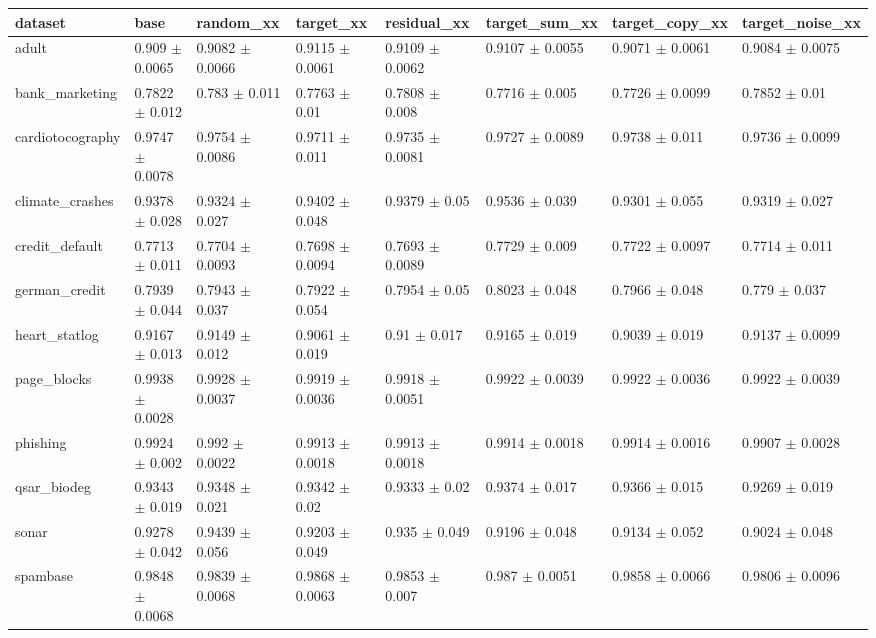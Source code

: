 \begin{tabular}{llllllll}
\toprule
dataset & base & random\_xx & target\_xx & residual\_xx & target\_sum\_xx & target\_copy\_xx & target\_noise\_xx \\
\midrule
adult & 0.909 $\pm$ 0.0065 & 0.9082 $\pm$ 0.0066 & 0.9115 $\pm$ 0.0061 & 0.9109 $\pm$ 0.0062 & 0.9107 $\pm$ 0.0055 & 0.9071 $\pm$ 0.0061 & 0.9084 $\pm$ 0.0075 \\
bank\_marketing & 0.7822 $\pm$ 0.012 & 0.783 $\pm$ 0.011 & 0.7763 $\pm$ 0.01 & 0.7808 $\pm$ 0.008 & 0.7716 $\pm$ 0.005 & 0.7726 $\pm$ 0.0099 & 0.7852 $\pm$ 0.01 \\
cardiotocography & 0.9747 $\pm$ 0.0078 & 0.9754 $\pm$ 0.0086 & 0.9711 $\pm$ 0.011 & 0.9735 $\pm$ 0.0081 & 0.9727 $\pm$ 0.0089 & 0.9738 $\pm$ 0.011 & 0.9736 $\pm$ 0.0099 \\
climate\_crashes & 0.9378 $\pm$ 0.028 & 0.9324 $\pm$ 0.027 & 0.9402 $\pm$ 0.048 & 0.9379 $\pm$ 0.05 & 0.9536 $\pm$ 0.039 & 0.9301 $\pm$ 0.055 & 0.9319 $\pm$ 0.027 \\
credit\_default & 0.7713 $\pm$ 0.011 & 0.7704 $\pm$ 0.0093 & 0.7698 $\pm$ 0.0094 & 0.7693 $\pm$ 0.0089 & 0.7729 $\pm$ 0.009 & 0.7722 $\pm$ 0.0097 & 0.7714 $\pm$ 0.011 \\
german\_credit & 0.7939 $\pm$ 0.044 & 0.7943 $\pm$ 0.037 & 0.7922 $\pm$ 0.054 & 0.7954 $\pm$ 0.05 & 0.8023 $\pm$ 0.048 & 0.7966 $\pm$ 0.048 & 0.779 $\pm$ 0.037 \\
heart\_statlog & 0.9167 $\pm$ 0.013 & 0.9149 $\pm$ 0.012 & 0.9061 $\pm$ 0.019 & 0.91 $\pm$ 0.017 & 0.9165 $\pm$ 0.019 & 0.9039 $\pm$ 0.019 & 0.9137 $\pm$ 0.0099 \\
page\_blocks & 0.9938 $\pm$ 0.0028 & 0.9928 $\pm$ 0.0037 & 0.9919 $\pm$ 0.0036 & 0.9918 $\pm$ 0.0051 & 0.9922 $\pm$ 0.0039 & 0.9922 $\pm$ 0.0036 & 0.9922 $\pm$ 0.0039 \\
phishing & 0.9924 $\pm$ 0.002 & 0.992 $\pm$ 0.0022 & 0.9913 $\pm$ 0.0018 & 0.9913 $\pm$ 0.0018 & 0.9914 $\pm$ 0.0018 & 0.9914 $\pm$ 0.0016 & 0.9907 $\pm$ 0.0028 \\
qsar\_biodeg & 0.9343 $\pm$ 0.019 & 0.9348 $\pm$ 0.021 & 0.9342 $\pm$ 0.02 & 0.9333 $\pm$ 0.02 & 0.9374 $\pm$ 0.017 & 0.9366 $\pm$ 0.015 & 0.9269 $\pm$ 0.019 \\
sonar & 0.9278 $\pm$ 0.042 & 0.9439 $\pm$ 0.056 & 0.9203 $\pm$ 0.049 & 0.935 $\pm$ 0.049 & 0.9196 $\pm$ 0.048 & 0.9134 $\pm$ 0.052 & 0.9024 $\pm$ 0.048 \\
spambase & 0.9848 $\pm$ 0.0068 & 0.9839 $\pm$ 0.0068 & 0.9868 $\pm$ 0.0063 & 0.9853 $\pm$ 0.007 & 0.987 $\pm$ 0.0051 & 0.9858 $\pm$ 0.0066 & 0.9806 $\pm$ 0.0096 \\

\end{tabular}
